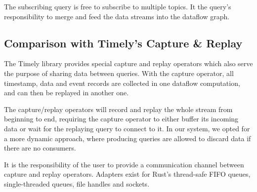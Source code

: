 The subscribing query is free to subscribe to multiple topics. It the query's
responsibility to merge and feed the data streams into the dataflow graph.

\subsection{Comparison with Timely's Capture \& Replay}

The Timely library provides special capture and replay operators which also serve the
purpose of sharing data between queries. With the capture operator, all timestamp,
data and event records are collected in one dataflow computation,
and can then be replayed in another one.

The capture/replay operators will record and replay the whole stream from beginning
to end, requiring the capture operator to either buffer its incoming data or
wait for the replaying query to connect to it. 
In our system, we opted for a more dynamic approach, where
producing queries are allowed to discard data if there are no consumers.

It is the responsibility of the user to provide a communication channel between
capture and  replay operators. Adapters exist for Rust's thread-safe FIFO queues,
single-threaded queues, file handles and sockets.

